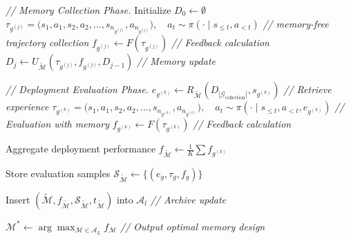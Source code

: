 \documentclass{article}
\theoremstyle{plain}
\theoremstyle{definition}
\theoremstyle{remark}
\begin{document}
\begin{algorithm}[H]
\begin{algorithmic}[1]
        \item[] \textit{// Memory Collection Phase.}
        \STATE Initialize $D_0 \leftarrow \emptyset$
            \STATE $\tau_{g^{(j)}} 
= \big( s_1, a_1, s_2, a_2, \ldots, s_{n_{g^{(j)}} }, a_{n_{g^{(j)}} } \big),
\quad 
a_t \sim \pi(\cdot \mid s_{\le t}, a_{<t})$
            \hfill \textit{// memory-free trajectory collection}
            \STATE $f_{g^{(j)}} \leftarrow F(\tau_{g^{(j)}})$
            \hfill \textit{// Feedback calculation}
            \STATE
            $
            D_j \leftarrow U_{\tilde{\mathcal{M}}}(\tau_{g^{(j)}}, f_{g^{(j)}}, D_{j-1})
            $
            \hfill \textit{// Memory update }
        \ENDFOR

        \item[] \textit{// Deployment Evaluation Phase.}
            \STATE $e_{g^{(k)}} \leftarrow R_{\tilde{\mathcal{M}}}(D_{|\mathcal{G}_{\text{collection}}|}, s_{g^{(k)}})$
            \hfill \textit{// Retrieve experience }
            \STATE $\tau_{g^{(k)}}= \big( s_1, a_1, s_2, a_2, \ldots, s_{n_{g^{(k)}}}, a_{n_{g^{(k)}}} \big),
\quad 
a_t \sim \pi(\cdot \mid s_{\le t}, a_{<t}, e_{g^{(k)}})$ 
            \hfill \textit{// Evaluation with memory}
            \STATE $f_{g^{(k)}} \leftarrow F(\tau_{g^{(k)}})$
            \hfill \textit{// Feedback calculation}
        \ENDFOR

        \STATE Aggregate deployment performance $f_{\tilde{\mathcal{M}}} \leftarrow \frac{1}{K}\sum f_{g^{(k)}}$

        \STATE Store evaluation samples
        $
        \mathcal{S}_{\tilde{\mathcal{M}}} \leftarrow \{ (e_g, \tau_g, f_g) \}
        $

        \STATE Insert
        $
        (\tilde{\mathcal{M}}, f_{\tilde{\mathcal{M}}}, \mathcal{S}_{\tilde{\mathcal{M}}}, t_{\tilde{\mathcal{M}}})
        $
        into $\mathcal{A}_l$
        \hfill \textit{// Archive update}

    \ENDFOR

\ENDFOR

\STATE
$
\mathcal{M}^* \leftarrow \arg\max_{\mathcal{M} \in \mathcal{A}_L} f_{\mathcal{M}}
$
\hfill \textit{// Output optimal memory design}

\end{algorithmic}
\end{algorithm}
\end{document}
